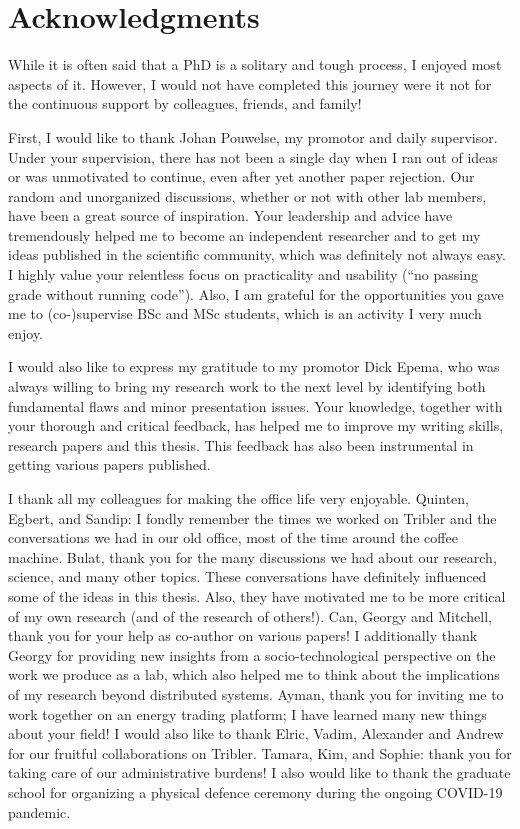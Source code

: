 \chapter*{Acknowledgments}

While it is often said that a PhD is a solitary and tough process, I enjoyed most aspects of it.
However, I would not have completed this journey were it not for the continuous support by colleagues, friends, and family!

First, I would like to thank Johan Pouwelse, my promotor and daily supervisor.
Under your supervision, there has not been a single day when I ran out of ideas or was unmotivated to continue, even after yet another paper rejection.
Our random and unorganized discussions, whether or not with other lab members, have been a great source of inspiration.
Your leadership and advice have tremendously helped me to become an independent researcher and to get my ideas published in the scientific community, which was definitely not always easy.
I highly value your relentless focus on practicality and usability (\enquote{no passing grade without running code}).
Also, I am grateful for the opportunities you gave me to (co-)supervise BSc and MSc students, which is an activity I very much enjoy.

I would also like to express my gratitude to my promotor Dick Epema, who was always willing to bring my research work to the next level by identifying both fundamental flaws and minor presentation issues.
Your knowledge, together with your thorough and critical feedback, has helped me to improve my writing skills, research papers and this thesis.
This feedback has also been instrumental in getting various papers published.

I thank all my colleagues for making the office life very enjoyable.
Quinten, Egbert, and Sandip: I fondly remember the times we worked on Tribler and the conversations we had in our old office, most of the time around the coffee machine.
Bulat, thank you for the many discussions we had about our research, science, and many other topics.
These conversations have definitely influenced some of the ideas in this thesis. Also, they have motivated me to be more critical of my own research (and of the research of others!).
Can, Georgy and Mitchell, thank you for your help as co-author on various papers!
I additionally thank Georgy for providing new insights from a socio-technological perspective on the work we produce as a lab, which also helped me to think about the implications of my research beyond distributed systems.
Ayman, thank you for inviting me to work together on an energy trading platform; I have learned many new things about your field!
I would also like to thank Elric, Vadim, Alexander and Andrew for our fruitful collaborations on Tribler.
Tamara, Kim, and Sophie: thank you for taking care of our administrative burdens!
I also would like to thank the graduate school for organizing a physical defence ceremony during the ongoing COVID-19 pandemic.

